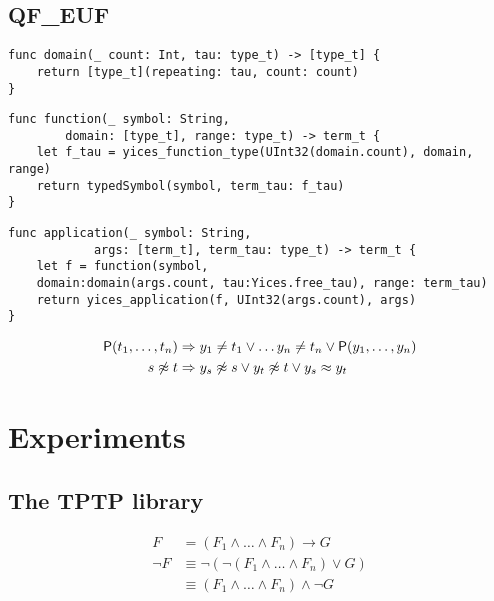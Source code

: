 \subsection{QF\_EUF}

\begin{lstlisting}[language=flea]
func domain(_ count: Int, tau: type_t) -> [type_t] {
	return [type_t](repeating: tau, count: count)
}
\end{lstlisting}

\begin{lstlisting}[language=flea]
func function(_ symbol: String,
		domain: [type_t], range: type_t) -> term_t {
	let f_tau = yices_function_type(UInt32(domain.count), domain, range)
	return typedSymbol(symbol, term_tau: f_tau)
}
\end{lstlisting}

\begin{lstlisting}[language=flea]
func application(_ symbol: String,
			args: [term_t], term_tau: type_t) -> term_t {
	let f = function(symbol,
	domain:domain(args.count, tau:Yices.free_tau), range: term_tau)
	return yices_application(f, UInt32(args.count), args)
}
\end{lstlisting}


\begin{definition}

	\end{definition}

\begin{example}
	\begin{align*}
	\mathsf{P}(t_1,\ldots, t_n) &\Rightarrow y_1\neq t_1 \lor \ldots y_n\neq t_n \lor \mathsf{P}(y_1,\ldots,y_n) \\
	s \not\approx t &\Rightarrow y_s\not\approx s\lor y_t\not\approx t \lor y_s \approx y_t \\
	\end{align*}
	\end{example}







\section{Experiments}\label{{sec:flea:evaluation}}

\subsection{The TPTP library}

\begin{align*}
F
&=
(F_1 \land \ldots \land F_n) \rightarrow G
\\
\lnot F
&\equiv
\lnot\left( \lnot(F_1 \land \ldots \land F_n) \lor G \right)
\\
&\equiv
(F_1 \land \ldots \land F_n) \land \lnot G
\end{align*}

